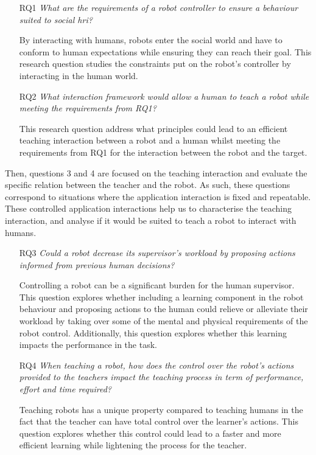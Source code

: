 \begin{itemize}
	\item [RQ1] \emph{What are the requirements of a robot controller to ensure a behaviour suited to social \gls{hri}?} 
	
		By interacting with humans, robots enter the social world and have to conform to human expectations while ensuring they can reach their goal. This research question studies the constraints put on the robot's controller by interacting in the human world. 
		
    \item [RQ2] \emph{What interaction framework would allow a human to teach a robot while meeting the requirements from RQ1?}
    
    	This research question address what principles could lead to an efficient teaching interaction between a robot and a human whilst meeting the requirements from RQ1 for the interaction between the robot and the target. 
\end{itemize}    	

Then, questions 3 and 4 are focused on the teaching interaction and evaluate the specific relation between the teacher and the robot. As such, these questions correspond to situations where the application interaction is fixed and repeatable. These controlled application interactions help us to characterise the teaching interaction, and analyse if it would be suited to teach a robot to interact with humans.
\begin{itemize}
    \item [RQ3] \emph{Could a robot decrease its supervisor's workload by proposing actions informed from previous human decisions?}
    
        Controlling a robot can be a significant burden for the human supervisor. This question explores whether including a learning component in the robot behaviour and proposing actions to the human could relieve or alleviate their workload by taking over some of the mental and physical requirements of the robot control. Additionally, this question explores whether this learning impacts the performance in the task.
    
    \item [RQ4] \emph{When teaching a robot, how does the control over the robot's actions provided to the teachers impact the teaching process in term of performance, effort and time required?} 
    
    	Teaching robots has a unique property compared to teaching humans in the fact that the teacher can have total control over the learner's actions. This question explores whether this control could lead to a faster and more efficient learning while lightening the process for the teacher.
\end{itemize}    	


